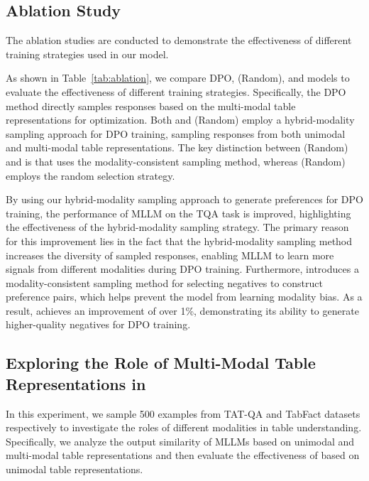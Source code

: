 \subsection{Ablation Study}
The ablation studies are conducted to demonstrate the effectiveness of different training strategies used in our \method{} model.

As shown in Table~\ref{tab:ablation}, we compare DPO, \method{} (Random), and \method{} models to evaluate the effectiveness of different training strategies. Specifically, the DPO method directly samples responses based on the multi-modal table representations for optimization. Both \method{} and \method{} (Random) employ a hybrid-modality sampling approach for DPO training, sampling responses from both unimodal and multi-modal table representations. The key distinction between \method{} (Random) and \method{} is that \method{} uses the modality-consistent sampling method, whereas \method{} (Random) employs the random selection strategy.


By using our hybrid-modality sampling approach to generate preferences for DPO training, the performance of MLLM on the TQA task is improved, highlighting the effectiveness of the hybrid-modality sampling strategy. The primary reason for this improvement lies in the fact that the hybrid-modality sampling method increases the diversity of sampled responses, enabling MLLM to learn more signals from different modalities during DPO training. Furthermore, \method{} introduces a modality-consistent sampling method for selecting negatives to construct preference pairs, which helps prevent the model from learning modality bias. As a result, \method{} achieves an improvement of over 1\%, demonstrating its ability to generate higher-quality negatives for DPO training.



\subsection{Exploring the Role of Multi-Modal Table Representations in \method{}}

In this experiment, we sample 500 examples from TAT-QA and TabFact datasets respectively to investigate the roles of different modalities in table understanding. Specifically, we analyze the output similarity of MLLMs based on unimodal and multi-modal table representations and then evaluate the effectiveness of \method{} based on unimodal table representations.

